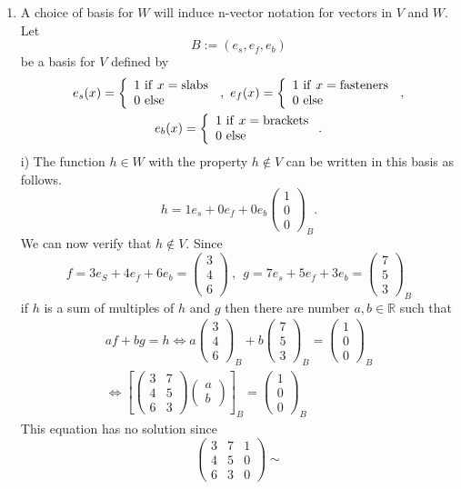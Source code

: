 \documentclass[12pt]{article}
\def\R{{\mathbb{R}}}
\def\b{\beta}
\def\ba{\left(\begin{array}{cc}}
\def\bv{\left(\begin{array}{c}}
\def\ev{\end{array}\right) }
\def\LR{\Leftrightarrow}
\begin{document}
\begin{enumerate}
\begin{enumerate}
\item 
A choice of basis for $W$ will induce n-vector notation for vectors in $V$ and $W$.
Let 
\[B:=( e_s,e_f,e_b)\] 
be a basis for $V$ defined by 
\begin{gather*}
e_s(x)=\left\{ \begin{array}{l} 1 {\rm ~if~} x={\rm slabs}\\ 0 {\rm ~else~} \end{array} \right.\, , ~
e_f(x)=\left\{ \begin{array}{l} 1 {\rm ~if~} x={\rm fasteners}\\ 0 {\rm{~else~}} \end{array} \right.\, , \\
e_b(x)=\left\{ \begin{array}{l} 1 {\rm ~if~} x={\rm brackets }\\ 0 {\rm ~else~} \end{array} \right. .
\end{gather*}
i) The function $h\in W$ with the property $h\notin V$ can be written in this basis as follows.
\[h=1e_s+0e_f+0e_b \bv 1\\0\\0 \ev_B.\]
We can now verify that $h\notin V$. Since
\[f=3e_S+4e_f+6e_b=\bv 3\\4\\6 \ev~,~~g=7e_s+5e_f+3e_b = \bv 7\\5\\3 \ev_B\]
if $h$ is  a sum of multiples of $h$ and $g$ then there are number $a,b\in \R$ such that
\begin{gather*}af+bg=h \LR a\bv 3\\4\\6 \ev_B+b \bv 7\\5\\3 \ev_B= \bv 1\\0\\0 \ev_B\\
\LR \left[\ba 3&7 \\4&5\\6&3 \ev \bv a\\b \ev\right]_B= \bv 1\\0\\0 \ev_B\end{gather*}
This equation has no solution since 
\[
\left( \begin{array}{cc|c}
3&7&1\\4&5&0\\6&3&0
\end{array}\right)
\sim
\]
\end{enumerate}
\end{enumerate}
\end{document}
